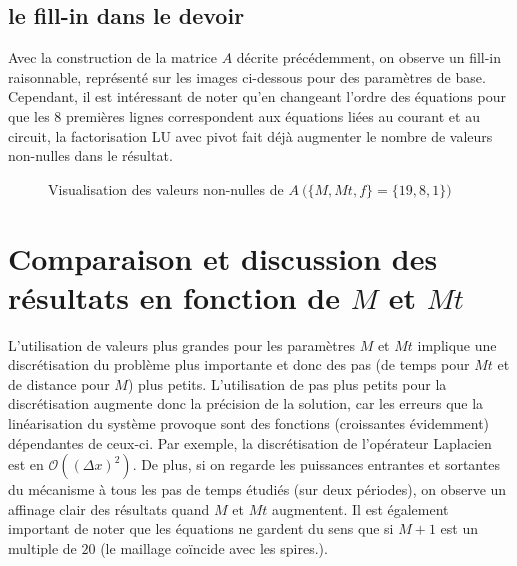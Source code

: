 \documentclass[11pt]{article}
\begin{document}
\subsection{le fill-in dans le devoir}

Avec la construction de la matrice $A$ décrite précédemment, on observe un fill-in raisonnable, représenté sur les images ci-dessous pour des paramètres de base. Cependant, il est intéressant de noter qu'en changeant l'ordre des équations pour que les 8 premières lignes correspondent aux équations liées au courant et au circuit, la factorisation LU avec pivot fait déjà augmenter le nombre de valeurs non-nulles dans le résultat.

\begin{figure}[H]
    \centering
    \qquad
    \caption{Visualisation des valeurs non-nulles de $A ~ \big(\{M, Mt, f\} = \{19, 8, 1\} \big) $ }
    \label{fig:example}
\end{figure}

\section{Comparaison et discussion des résultats en fonction de $M$ et $Mt$}

L'utilisation de valeurs plus grandes pour les paramètres $M$ et $Mt$ implique une discrétisation du problème plus importante et donc des pas (de temps pour $Mt$ et de distance pour $M$) plus petits. L'utilisation de pas plus petits pour la discrétisation augmente donc la précision de la solution, car les erreurs que la linéarisation du système provoque sont des fonctions (croissantes évidemment) dépendantes de ceux-ci. Par exemple, la discrétisation de l'opérateur Laplacien est en $\mathcal{O}((\Delta x)^2)$. De plus, si on regarde les puissances entrantes et sortantes du mécanisme à tous les pas de temps étudiés (sur deux périodes), on observe un affinage clair des résultats quand $M$ et $Mt$ augmentent. Il est également important de noter que les équations ne gardent du sens que si $M+1$ est un multiple de $20$ (le maillage coïncide avec les spires.).
\end{document}
